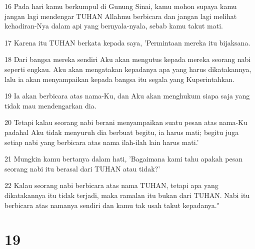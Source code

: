 \par 16 Pada hari kamu berkumpul di Gunung Sinai, kamu mohon supaya kamu jangan lagi mendengar TUHAN Allahmu berbicara dan jangan lagi melihat kehadiran-Nya dalam api yang bernyala-nyala, sebab kamu takut mati.
\par 17 Karena itu TUHAN berkata kepada saya, 'Permintaan mereka itu bijaksana.
\par 18 Dari bangsa mereka sendiri Aku akan mengutus kepada mereka seorang nabi seperti engkau. Aku akan mengatakan kepadanya apa yang harus dikatakannya, lalu ia akan menyampaikan kepada bangsa itu segala yang Kuperintahkan.
\par 19 Ia akan berbicara atas nama-Ku, dan Aku akan menghukum siapa saja yang tidak mau mendengarkan dia.
\par 20 Tetapi kalau seorang nabi berani menyampaikan suatu pesan atas nama-Ku padahal Aku tidak menyuruh dia berbuat begitu, ia harus mati; begitu juga setiap nabi yang berbicara atas nama ilah-ilah lain harus mati.'
\par 21 Mungkin kamu bertanya dalam hati, 'Bagaimana kami tahu apakah pesan seorang nabi itu berasal dari TUHAN atau tidak?'
\par 22 Kalau seorang nabi berbicara atas nama TUHAN, tetapi apa yang dikatakannya itu tidak terjadi, maka ramalan itu bukan dari TUHAN. Nabi itu berbicara atas namanya sendiri dan kamu tak usah takut kepadanya."

\chapter{19}


